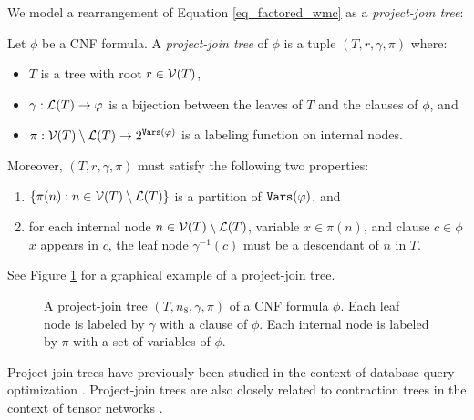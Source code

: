 We model a rearrangement of Equation \eqref{eq_factored_wmc} as a \emph{project-join tree}:
\begin{definition}
\label{def_jointree}
    Let $\phi$ be a CNF formula.
    A \emph{project-join tree} of $\phi$ is a tuple $(T, r, \gamma, \pi)$ where:
    \begin{itemize}
        \item $T$ is a tree with root $r \in \mathcal{V}(T)$,
        \item $\gamma: \mathcal{L}(T) \to \varphi$ is a bijection between the leaves of $T$ and the clauses of $\phi$, and
        \item $\pi: \mathcal{V}(T) \setminus \mathcal{L}(T) \to 2^{\texttt{\upshape Vars}(\varphi)}$ is a labeling function on internal nodes.
    \end{itemize}
    Moreover, $(T, r, \gamma, \pi)$ must satisfy the following two properties:
    \begin{enumerate}[ref=\arabic*]
        \item $\{\pi(n) : n \in \mathcal{V}(T) \setminus \mathcal{L}(T) \}$ is a partition of $\texttt{\upshape Vars}(\varphi)$, and \label{prop1}
        \item for each internal node $n \in \mathcal{V}(T) \setminus \mathcal{L}(T)$, variable $x \in \pi(n)$, and clause $c \in \phi$ \st{} $x$ appears in $c$, the leaf node $\gamma^{-1}(c)$ must be a descendant of $n$ in $T$. \label{prop2}
    \end{enumerate}
\end{definition}
See Figure \ref{fig_join_tree} for a graphical example of a project-join tree.
\begin{figure}%
    \centering
\caption{
    A project-join tree $(T, n_{8}, \gamma, \pi)$ of a CNF formula $\phi$.
    Each leaf node is labeled by $\gamma$ with a clause of $\phi$.
    Each internal node is labeled by $\pi$ with a set of variables of $\phi$.
}
\label{fig_join_tree}
\end{figure}
Project-join trees have previously been studied in the context of database-query optimization \cite{MPPV04}.
Project-join trees are also closely related to contraction trees in the context of tensor networks \cite{EP14}.

